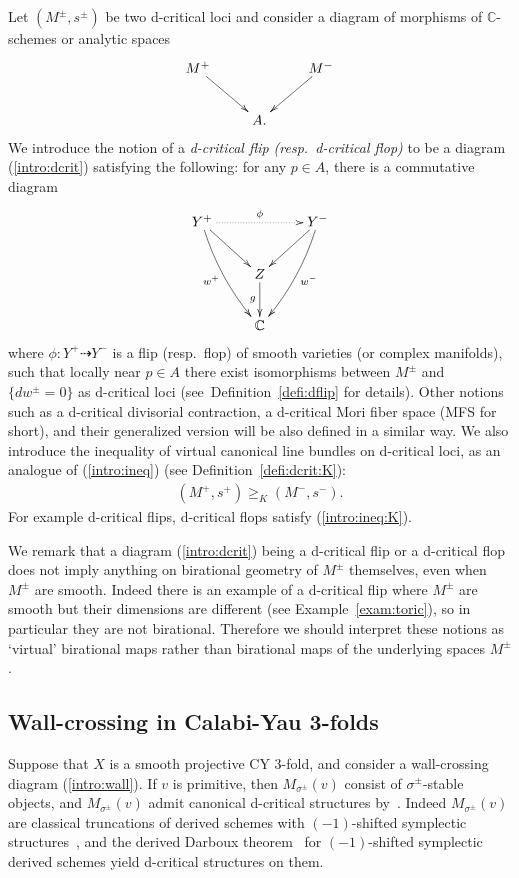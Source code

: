 \documentclass[11pt]{amsart}
\theoremstyle{plain}
\theoremstyle{definition}
\theoremstyle{remark}
\begin{document}
Let $(M^{\pm}, s^{\pm})$
be two d-critical loci and consider a diagram
of morphisms of $\mathbb{C}$-schemes or analytic spaces
\begin{align}\label{intro:dcrit}
\xymatrix{
M^{+} \ar[rd] & & M^{-} \ar[ld] \\
& A. &
}
\end{align}
We introduce the notion 
of a \textit{d-critical flip (resp.~d-critical flop)} to be
 a diagram (\ref{intro:dcrit}) satisfying the following: 
for any
$p \in A$, there is a commutative diagram 
\begin{align*}
\xymatrix{
Y^{+} \ar[rd] 
\ar@/_5pt/[rdd]_-{w^{+}}  \ar@{.>}[rr]^-{\phi}& & Y^{-} \ar[ld] 
\ar@/^5pt/[ldd]^-{w^-}\\
& Z \ar[d]_-{g} &  \\
& \mathbb{C} &
}
\end{align*}
where $ \phi \colon Y^{+} \dashrightarrow Y^{-}$ is a flip (resp.~flop)
of smooth varieties (or complex manifolds), 
such that locally near $p\in A$
there exist isomorphisms 
between 
$M^{\pm}$ and $\{dw^{\pm}=0\}$ as d-critical loci
(see~Definition~\ref{defi:dflip} for details).
Other notions such as a d-critical divisorial contraction, a d-critical 
Mori fiber space (MFS for short), and their generalized version will be also 
defined in a similar way. 
We also introduce the inequality of virtual canonical 
line bundles on d-critical loci, as an analogue of (\ref{intro:ineq})
(see Definition~\ref{defi:dcrit:K}): 
\begin{align}\label{intro:ineq:K}
(M^{+},s^{+}) \ge_K (M^{-}, s^{-}).
\end{align}
For example d-critical flips, d-critical flops 
satisfy (\ref{intro:ineq:K}). 

We remark that a diagram (\ref{intro:dcrit})
being a d-critical flip or a d-critical flop 
does not imply anything on birational geometry of 
$M^{\pm}$ themselves, even when $M^{\pm}$ are smooth. 
Indeed there is an example of a d-critical flip
where $M^{\pm}$ are smooth but their dimensions 
are different (see Example~\ref{exam:toric}), so in particular they are 
not birational. 
Therefore we should interpret 
these notions as `virtual' birational 
maps rather than birational maps 
of the underlying spaces $M^{\pm}$. 


\subsection{Wall-crossing in Calabi-Yau 3-folds}
Suppose that $X$ is a smooth projective CY 3-fold, 
and consider a wall-crossing diagram (\ref{intro:wall}). 
If $v$ is primitive, 
then 
$M_{\sigma^{\pm}}(v)$ 
consist of $\sigma^{\pm}$-stable 
objects, and
 $M_{\sigma^{\pm}}(v)$ 
admit canonical d-critical structures 
by~\cite{MR3352237}.
Indeed 
$M_{\sigma^{\pm}}(v)$ are classical truncations of derived schemes 
with $(-1)$-shifted symplectic structures~\cite{PTVV}, and 
the derived Darboux theorem~\cite{MR3352237} for 
$(-1)$-shifted symplectic derived schemes 
yield d-critical structures on them. 
\end{document}
